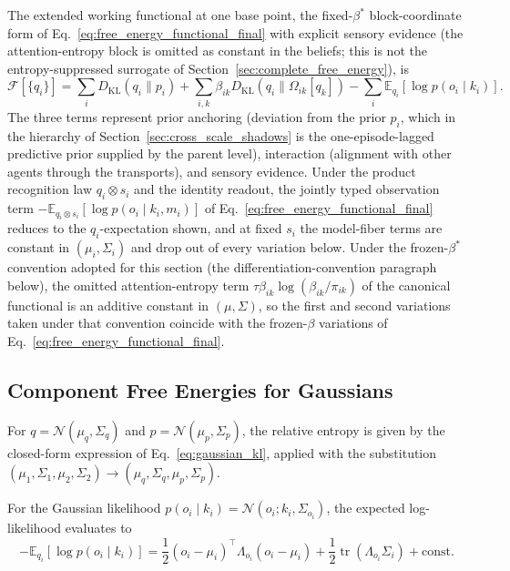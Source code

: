 \documentclass[11pt]{article}
\begin{document}
The extended working functional at one base point, the fixed-$\beta^*$ block-coordinate form of Eq.~\eqref{eq:free_energy_functional_final} with explicit sensory evidence (the attention-entropy block is omitted as constant in the beliefs; this is not the entropy-suppressed surrogate of Section~\ref{sec:complete_free_energy}), is
\begin{equation}
\mathcal{F}[\{q_i\}] = \sum_i D_{\mathrm{KL}}(q_i \| p_i) + \sum_{i,k} \beta_{ik} D_{\mathrm{KL}}(q_i \| \Omega_{ik}[q_k]) - \sum_i \mathbb{E}_{q_i}[\log p(o_i \mid k_i)].
\label{eq:extended_free_energy}
\end{equation}
The three terms represent prior anchoring (deviation from the prior $p_i$, which in the hierarchy of Section~\ref{sec:cross_scale_shadows} is the one-episode-lagged predictive prior supplied by the parent level), interaction (alignment with other agents through the transports), and sensory evidence. Under the product recognition law $q_i \otimes s_i$ and the identity readout, the jointly typed observation term $-\mathbb{E}_{q_i \otimes s_i}[\log p(o_i \mid k_i, m_i)]$ of Eq.~\eqref{eq:free_energy_functional_final} reduces to the $q_i$-expectation shown, and at fixed $s_i$ the model-fiber terms are constant in $(\mu_i, \Sigma_i)$ and drop out of every variation below. Under the frozen-$\beta^*$ convention adopted for this section (the differentiation-convention paragraph below), the omitted attention-entropy term $\tau\beta_{ik}\log(\beta_{ik}/\pi_{ik})$ of the canonical functional is an additive constant in $(\mu, \Sigma)$, so the first and second variations taken under that convention coincide with the frozen-$\beta$ variations of Eq.~\eqref{eq:free_energy_functional_final}.

\subsection{Component Free Energies for Gaussians}

For $q = \mathcal{N}(\mu_q, \Sigma_q)$ and $p = \mathcal{N}(\mu_p, \Sigma_p)$, the relative entropy is given by the closed-form expression of Eq.~\eqref{eq:gaussian_kl}, applied with the substitution $(\mu_1, \Sigma_1, \mu_2, \Sigma_2) \to (\mu_q, \Sigma_q, \mu_p, \Sigma_p)$.

For the Gaussian likelihood $p(o_i \mid k_i) = \mathcal{N}(o_i; k_i, \Sigma_{o_i})$, the expected log-likelihood evaluates to
\begin{equation}
-\mathbb{E}_{q_i}[\log p(o_i \mid k_i)] = \frac{1}{2}(o_i - \mu_i)^\top \Lambda_{o_i}(o_i - \mu_i) + \frac{1}{2}\operatorname{tr}(\Lambda_{o_i}\Sigma_i) + \mathrm{const}.
\end{equation}
\end{document}
